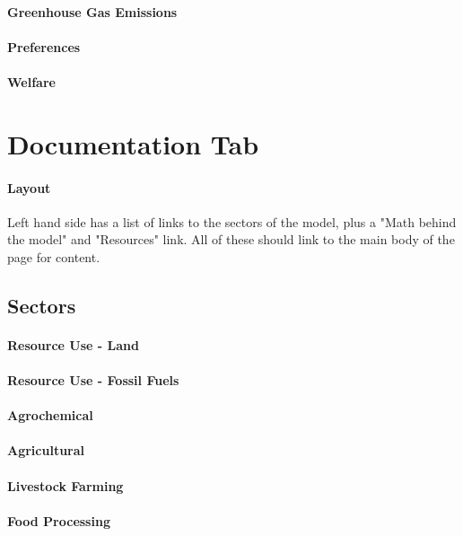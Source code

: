 \documentclass[10pt]{article}
\begin{document}
\paragraph{Greenhouse Gas Emissions}
\paragraph{Preferences}
\paragraph{Welfare}




\section{Documentation Tab}
\paragraph{Layout}
Left hand side has a list of links to the sectors of the model, plus a "Math behind the model" and "Resources" link. All of these should link to the main body of the page for content. 

\subsection{Sectors}

\paragraph{Resource Use - Land}
\paragraph{Resource Use - Fossil Fuels}
\paragraph{Agrochemical}
\paragraph{Agricultural}
\paragraph{Livestock Farming}
\paragraph{Food Processing}
\end{document}

